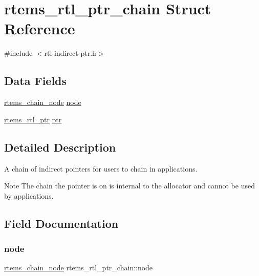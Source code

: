 \hypertarget{structrtems__rtl__ptr__chain}{}\section{rtems\+\_\+rtl\+\_\+ptr\+\_\+chain Struct Reference}
\label{structrtems__rtl__ptr__chain}


{\ttfamily \#include $<$rtl-\/indirect-\/ptr.\+h$>$}

\subsection*{Data Fields}
\begin{DoxyCompactItemize}
\item 
\mbox{\hyperlink{structChain__Node__struct}{rtems\+\_\+chain\+\_\+node}} \mbox{\hyperlink{structrtems__rtl__ptr__chain_ad633f28db27c06d7053a1984a3f28e16}{node}}
\item 
\mbox{\hyperlink{structrtems__rtl__ptr}{rtems\+\_\+rtl\+\_\+ptr}} \mbox{\hyperlink{structrtems__rtl__ptr__chain_a36868f3df93b3a89745e67304f49774c}{ptr}}
\end{DoxyCompactItemize}


\subsection{Detailed Description}
A chain of indirect pointers for users to chain in applications.

\begin{DoxyNote}{Note}
The chain the pointer is on is internal to the allocator and cannot be used by applications. 
\end{DoxyNote}


\subsection{Field Documentation}
\mbox{\label{structrtems__rtl__ptr__chain_ad633f28db27c06d7053a1984a3f28e16}} 
\subsubsection{\texorpdfstring{node}{node}}
{\footnotesize\ttfamily \mbox{\hyperlink{structChain__Node__struct}{rtems\+\_\+chain\+\_\+node}} rtems\+\_\+rtl\+\_\+ptr\+\_\+chain\+::node}

